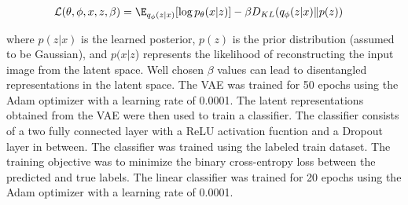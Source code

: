\documentclass{article}
\begin{document}
\begin{align}
  \mathcal{L}(\theta, \phi, x, z, \beta) & = \E_{q_\phi(z|x)}[\log p_\theta(x|z)] - \beta D_{KL}(q_\phi(z|x)\| p(z))
\end{align}

where $p(z|x)$ is the learned posterior, $p(z)$ is the prior distribution
(assumed to be Gaussian), and $p(x|z$) represents the likelihood of
reconstructing the input image from the latent space. Well chosen $\beta$
values can lead to disentangled representations in the latent space. The VAE
was trained for 50 epochs using the Adam optimizer with a learning rate of
0.0001. The latent representations obtained from the VAE were then used to
train a classifier. The classifier consists of a two fully connected layer with
a ReLU activation fucntion and a Dropout layer in between. The classifier was
trained using the labeled train dataset. The training objective was to minimize
the binary cross-entropy loss between the predicted and true labels. The linear
classifier was trained for 20 epochs using the Adam optimizer with a learning
rate of 0.0001.
\end{document}
